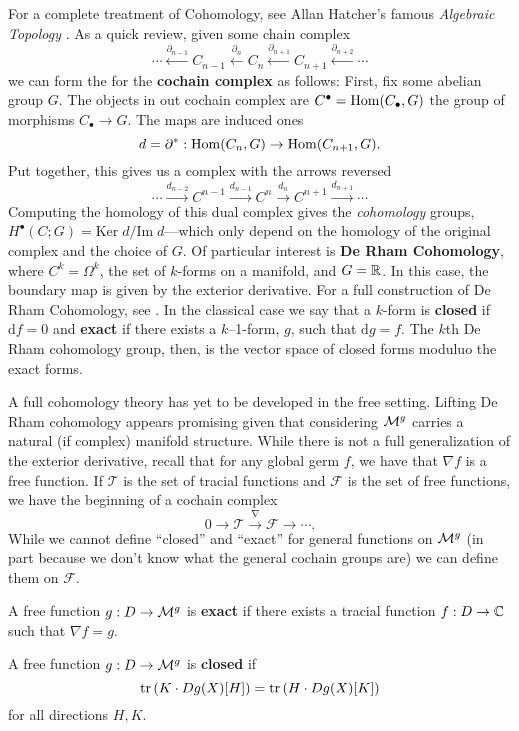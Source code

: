 For a complete treatment of Cohomology, see Allan Hatcher's famous
\emph{Algebraic Topology} \cite{hatcherAlgebraic2002}. As a quick review, given
some chain complex
\[
  \cdots
  \xleftarrow{\partial_{n-1}}
  C_{n-1}
  \xleftarrow{\partial_{n}}
  C_{n}
  \xleftarrow{\partial_{n+1}}
  C_{n+1}
  \xleftarrow{\partial_{n+2}}
  \cdots
\]
we can form the for the \textbf{cochain complex} as follows: First, fix some
abelian group \(G\). The objects in out cochain complex are
\(C^\bullet = \operatorname{Hom} (C_\bullet, G)\) the group of morphisms \(C_\bullet \to G\).
The maps are induced ones
\[
  d = \partial^* : \operatorname{Hom}(C_n,G) \to \operatorname{Hom}(C_{n+1},G).
\]
Put together, this gives us a complex with the arrows reversed
\[
  \cdots
  \xrightarrow{d_{n-2}}
  C^{n-1}
  \xrightarrow{d_{n-1}}
  C^{n}
  \xrightarrow{d_{n}}
  C^{n+1}
  \xrightarrow{d_{n+1}}
  \cdots
\]
Computing the homology of this dual complex gives the \emph{cohomology}
groups, \(H^\bullet (C; G)= \textrm{Ker}\;  d / \textrm{Im}\; d\)---which only
depend on the homology of the original complex and the choice of \(G\). Of
particular interest is \textbf{De Rham Cohomology}, where \(C^k = \Omega^k\), the
set of \(k\)-forms on a manifold, and \(G=\mathbb{R} \). In this case, the boundary map
is given by the exterior derivative. For a full construction of De Rham
Cohomology, see \cite{leeIntroduction2013}. In the classical case we say that a
\(k\)-form is \textbf{closed} if \(\text{d} f =0\) and \textbf{exact} if there
exists a \(k\)--1-form, \(g\), such that \(\text{d} g=f\). The \(k\)th De Rham
cohomology group, then, is the vector space of closed forms moduluo the exact
forms.

A full cohomology theory has yet to be developed in the free setting. Lifting
De Rham cohomology appears promising given that considering \(\mathcal{M}^{g} \) carries
a natural (if complex) manifold structure. While there is not a full
generalization of the exterior derivative, recall that for any global germ \(f\),
we have that \(\nabla f\) is a free function. If \(\mathcal{T}\) is the set of
tracial functions and \(\mathcal{F}\) is the set of free functions, we have the
beginning of a cochain complex
\[
  0 \rightarrow \mathcal{T} \xrightarrow{\nabla} \mathcal{F} \rightarrow \cdots.
\]
While we cannot define ``closed'' and ``exact'' for general functions on
\(\mathcal{M}^{g} \) (in part because we don't know what the general cochain groups are)
we can define them on \(\mathcal{F}\).
\begin{definition}[Exact]%
\label{def:exact}
  A free function \(g: D \to \mathcal{M}^{g} \) is \textbf{exact} if there exists a
  tracial function \(f: D \to \mathbb{C} \)
  such that \(\nabla f = g\).
\end{definition}
\begin{definition}[Closed]%
\label{def:closed}
  A free function \(g: D \to \mathcal{M}^{g} \) is \textbf{closed} if
  \[
    \operatorname{tr} \left( K \cdot Dg(X)[H] \right) = \operatorname{tr} \left( H \cdot Dg(X)[K] \right)
  \]
  for all directions \(H,K\).
\end{definition}

